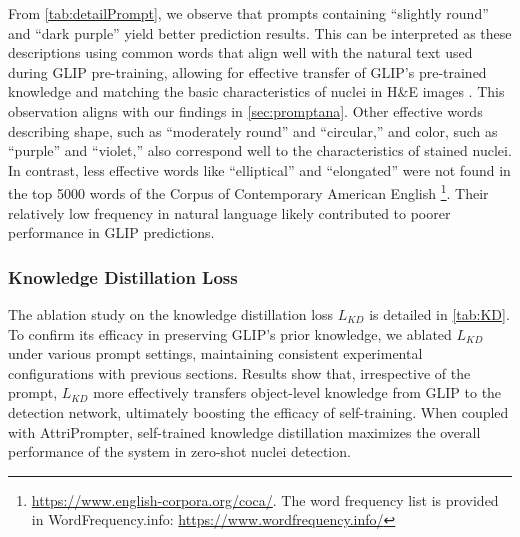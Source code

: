 \documentclass[journal,twoside,web]{ieeecolor}
\begin{document}
From \autoref{tab:detailPrompt}, we observe that prompts containing ``slightly round'' and ``dark purple'' yield better prediction results. This can be interpreted as these descriptions using common words that align well with the natural text used during GLIP pre-training, allowing for effective transfer of GLIP's pre-trained knowledge and matching the basic characteristics of nuclei in H\&E images \cite{shi2022nuclei}. This observation aligns with our findings in \autoref{sec:promptana}. Other effective words describing shape, such as ``moderately round'' and ``circular,'' and color, such as ``purple'' and ``violet,'' also correspond well to the characteristics of stained nuclei. In contrast, less effective words like ``elliptical'' and ``elongated'' were not found in the top 5000 words of the Corpus of Contemporary American English \footnote{\href{https://www.english-corpora.org/coca/}{https://www.english-corpora.org/coca/}. The word frequency list is provided in WordFrequency.info: \href{https://www.wordfrequency.info/}{https://www.wordfrequency.info/}}. Their relatively low frequency in natural language likely contributed to poorer performance in GLIP predictions.


\subsubsection{Knowledge Distillation Loss} The ablation study on the knowledge distillation loss $L_{KD}$ is detailed in \autoref{tab:KD}. To confirm its efficacy in preserving GLIP's prior knowledge, we ablated $L_{KD}$ under various prompt settings, maintaining consistent experimental configurations with previous sections. Results show that, irrespective of the prompt, $L_{KD}$ more effectively transfers object-level knowledge from GLIP to the detection network, ultimately boosting the efficacy of self-training. When coupled with AttriPrompter, self-trained knowledge distillation maximizes the overall performance of the system in zero-shot nuclei detection.
\end{document}
